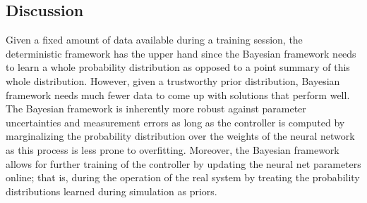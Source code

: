 
\subsection{Discussion}
\label{ssec:discussion}

Given a fixed amount of data available during a training session, the
deterministic framework has the upper hand since the Bayesian framework needs to
learn a whole probability distribution as opposed to a point summary of this
whole distribution. However, given a trustworthy prior distribution, Bayesian
framework needs much fewer data to come up with solutions that perform well. The
Bayesian framework is inherently more robust against parameter uncertainties and
measurement errors as long as the controller is computed by marginalizing the
probability distribution over the weights of the neural network as this process
is less prone to overfitting. Moreover, the Bayesian framework allows for
further training of the controller by updating the neural net parameters online;
that is, during the operation of the real system by treating the probability
distributions learned during simulation as priors.
